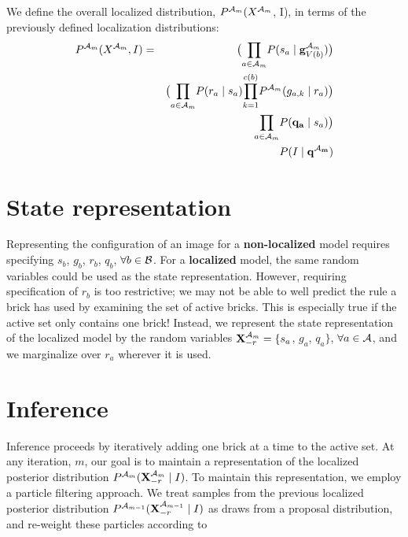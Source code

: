 \documentclass[11pt]{article}
\newcommand{\A}{{\cal A}}
\newcommand{\X}{\mathbf{X}}
\newcommand{\B}{\cal B}
\newcommand{\Xrm}{\X^{\Am}_{-r}}
\newcommand{\Am}{\A_{m}}
\begin{document}
We define the overall localized distribution, $P^{\Am}(X^{\Am}$, I), in terms of the previously defined localization distributions:
\begin{eqnarray}
P^{\Am}(X^{\Am}, I)
&=& \big({\displaystyle \prod_{a \in {\Am}}} P(s_a \mid \mathbf{g}^{\Am}_{V({b})}) \big ) \\
& & \big( {\displaystyle \prod_{a \in {\Am}}} P(r_a \mid s_a) {\displaystyle \prod_{k=1}^{c(b)}} P^{\Am}(g_{a,k} \mid r_a) \big) \\
& & {\displaystyle \prod_{a \in {\Am}}} P(\mathbf{q_a} \mid s_a)\big) \\
& & P(I \mid \mathbf{q^{\Am}})
\end{eqnarray}

\section*{State representation}

Representing the configuration of an image for a \textbf{non-localized} model requires specifying $s_b$, $g_b$, $r_b$, $q_b$, $\forall b \in \B$. For a \textbf{localized} model, the same random variables could be used as the state representation. However, requiring specification of $r_b$ is too restrictive; we may not be able to well predict the rule a brick has used by examining the set of active bricks. This is especially true if the active set only contains one brick! Instead, we represent the state representation of the localized model by the random variables $\Xrm = \{s_a$, $g_a$, $q_a\}$, $\forall a \in \A$, and we marginalize over $r_a$ wherever it is used.

\section*{Inference}

Inference proceeds by iteratively adding one brick at a time to the active set. At any iteration, $m$, our goal is to maintain a representation of the localized posterior distribution $P^{\Am}(\Xrm \mid I)$. To maintain this representation, we employ a particle filtering approach. We treat samples from the previous localized posterior distribution $P^{\A_{m-1}}(\X^{\A_{m-1}}_{-r} \mid I)$ as draws from a proposal distribution, and re-weight these particles according to

\end{document}
